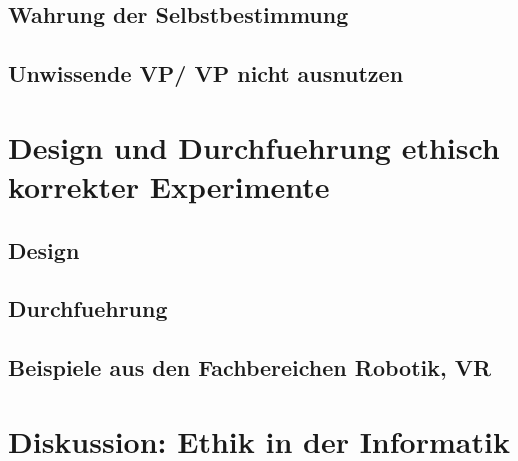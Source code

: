 \documentclass[10pt]{beamer}
\begin{document}
\subsection{Wahrung der Selbstbestimmung}

\subsection{Unwissende VP/ VP nicht ausnutzen}

\section{Design und Durchfuehrung ethisch korrekter Experimente}
\subsection{Design}
\subsection{Durchfuehrung}

\subsection{Beispiele aus den Fachbereichen Robotik, VR}


\section{Diskussion: Ethik in der Informatik}
\end{document}
